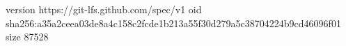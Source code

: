 version https://git-lfs.github.com/spec/v1
oid sha256:a35a2ceea03de8a4c158c2fcde1b213a55f30d279a5c38704224b9cd46096f01
size 87528
